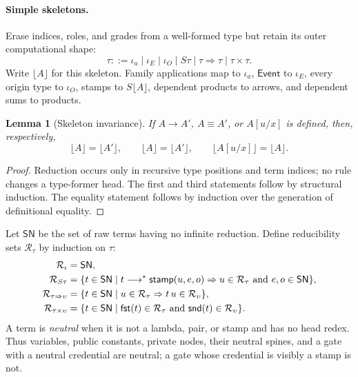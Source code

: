 \documentclass[11pt]{article}
\numberwithin{equation}{section}
\theoremstyle{definition}
\theoremstyle{plain}
\newtheorem{lemma}[definition]{Lemma}
\theoremstyle{remark}
\newcommand{\Event}{\mathsf{Event}}
\newcommand{\jdeq}{\equiv}
\newcommand{\fst}{\AFFst}
\newcommand{\snd}{\AFSnd}
\begin{document}
\paragraph{Simple skeletons.}
Erase indices, roles, and grades from a well-formed type but retain its outer
computational shape:
\[
 \tau ::= \iota_a\mid\iota_E\mid\iota_O
       \mid S\tau\mid\tau\Rightarrow\tau\mid\tau\times\tau .
\]
Write \(\lfloor A\rfloor\) for this skeleton.  Family applications map to
\(\iota_a\), \(\Event\) to \(\iota_E\), every origin type to
\(\iota_O\), stamps to \(S\lfloor A\rfloor\), dependent products to arrows,
and dependent sums to products.

\begin{lemma}[Skeleton invariance]\label{lem:skeleton}
If \(A\longrightarrow A'\), \(A\jdeq A'\), or \(A[u/x]\) is defined, then,
respectively,
\[
 \lfloor A\rfloor=\lfloor A'\rfloor,
 \qquad
 \lfloor A\rfloor=\lfloor A'\rfloor,
 \qquad
 \lfloor A[u/x]\rfloor=\lfloor A\rfloor.
\]
\end{lemma}

\begin{proof}
Reduction occurs only in recursive type positions and term indices; no rule
changes a type-former head.  The first and third statements follow by
structural induction.  The equality statement follows by induction over the
generation of definitional equality.
\end{proof}

Let \(\mathsf{SN}\) be the set of raw terms having no infinite reduction.
Define reducibility sets \(\mathcal R_\tau\) by induction on \(\tau\):
\begin{align*}
 \mathcal R_{\iota}&=\mathsf{SN},\\
 \mathcal R_{S\tau}&=
 \{t\in\mathsf{SN}\mid
   t\longrightarrow^*\mathsf{stamp}(u,e,o)
   \Rightarrow u\in\mathcal R_\tau\text{ and }e,o\in\mathsf{SN}\},\\
 \mathcal R_{\tau\Rightarrow\upsilon}&=
 \{t\in\mathsf{SN}\mid
   u\in\mathcal R_\tau\Rightarrow t\,u\in\mathcal R_\upsilon\},\\
 \mathcal R_{\tau\times\upsilon}&=
 \{t\in\mathsf{SN}\mid
   \fst(t)\in\mathcal R_\tau\text{ and }
   \snd(t)\in\mathcal R_\upsilon\}.
\end{align*}
A term is \emph{neutral} when it is not a lambda, pair, or stamp and has no
head redex.  Thus variables, public constants, private nodes, their neutral
spines, and a gate with a neutral credential are neutral; a gate whose
credential is visibly a stamp is not.
\end{document}
